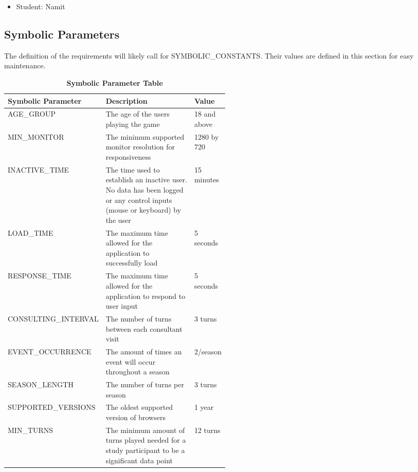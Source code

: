 \documentclass{article}
\begin{document}
\begin{enumerate}
        \begin{itemize}
                \item Student: Namit
            \end{itemize}
\end{enumerate}


\subsection{Symbolic Parameters}

The definition of the requirements will likely call for SYMBOLIC\_CONSTANTS.
Their values are defined in this section for easy maintenance.


\begin{table}[h]
\caption{\bf Symbolic Parameter Table}
\begin{tabular}{|l|p{0.5\linewidth}|l|}
\hline
\multicolumn{1}{|l}{\bfseries Symbolic Parameter} & \multicolumn{1}{|l|}{\bfseries Description} & \multicolumn{1}{l|}{\bfseries Value}\\
\hline
AGE\_GROUP & The age of the users playing the game & 18 and above \\
\hline
MIN\_MONITOR & The minimum supported monitor resolution for responsiveness & 1280 by 720 \\
\hline
INACTIVE\_TIME & The time used to establish an inactive user. No data has been logged or any control inputs (mouse or keyboard) by the user & 15 minutes \\
\hline
LOAD\_TIME & The maximum time allowed for the application to successfully load & 5 seconds \\
\hline
RESPONSE\_TIME & The maximum time allowed for the application to respond to user input & 5 seconds \\
\hline
CONSULTING\_INTERVAL & The number of turns between each consultant visit & 3 turns \\
\hline
EVENT\_OCCURRENCE & The amount of times an event will occur throughout a season & 2/season \\
\hline
SEASON\_LENGTH & The number of turns per season & 3 turns \\
\hline
SUPPORTED\_VERSIONS & The oldest supported version of browsers & 1 year \\
\hline
MIN\_TURNS & The minimum amount of turns played needed for a study participant to be a significant data point & 12 turns \\
\hline
\end{tabular}
\end{table}
\end{document}
